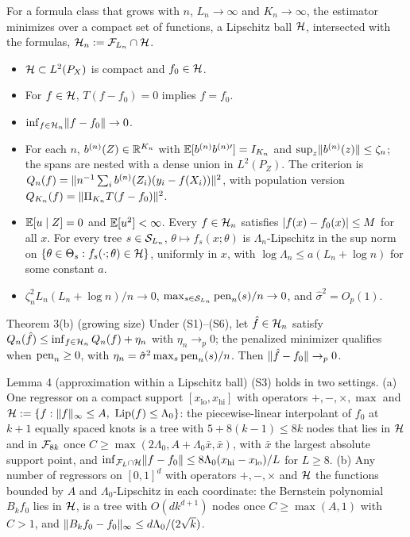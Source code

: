 For a formula class that grows with $n$, $L_n \to \infty$ and $K_n \to \infty$, the estimator minimizes over a compact set of functions, a Lipschitz ball $\mathcal{H}$, intersected with the formulas, $\mathcal{H}_n := \mathcal{F}_{L_n} \cap \mathcal{H}$.
\begin{itemize}
\item[(S1)] $\mathcal{H} \subset L^2(P_X)$ is compact and $f_0 \in \mathcal{H}$.
\item[(S2)] For $f \in \mathcal{H}$, $T(f - f_0) = 0$ implies $f = f_0$.
\item[(S3)] $\inf_{f \in \mathcal{H}_n}\lVert f - f_0\rVert \to 0$.
\item[(S4)] For each $n$, $b^{(n)}(Z) \in \mathbb{R}^{K_n}$ with $\mathbb{E}[b^{(n)}b^{(n)\prime}] = I_{K_n}$ and $\sup_z\lVert b^{(n)}(z)\rVert \le \zeta_n$; the spans are nested with a dense union in $L^2(P_Z)$. The criterion is $Q_n(f) = \lVert n^{-1}\sum_ib^{(n)}(Z_i)(y_i - f(X_i))\rVert^2$, with population version $Q_{K_n}(f) = \lVert \Pi_{K_n}T(f - f_0)\rVert^2$.
\item[(S5)] $\mathbb{E}[u \mid Z] = 0$ and $\mathbb{E}[u^2] < \infty$. Every $f \in \mathcal{H}_n$ satisfies $\lvert f(x) - f_0(x)\rvert \le M$ for all $x$. For every tree $s \in \mathcal{S}_{L_n}$, $\theta \mapsto f_s(x;\theta)$ is $\Lambda_n$-Lipschitz in the sup norm on $\{\theta \in \Theta_s : f_s(\cdot;\theta) \in \mathcal{H}\}$, uniformly in $x$, with $\log\Lambda_n \le a(L_n + \log n)$ for some constant $a$.
\item[(S6)] $\zeta_n^2L_n(L_n + \log n)/n \to 0$, $\max_{s \in \mathcal{S}_{L_n}}\mathrm{pen}_n(s)/n \to 0$, and $\hat\sigma^2 = O_p(1)$.
\end{itemize}

\begin{result}[Theorem3(b)]{Theorem 3(b) (growing size)}
Under (S1)--(S6), let $\hat f \in \mathcal{H}_n$ satisfy $Q_n(\hat f) \le \inf_{f \in \mathcal{H}_n}Q_n(f) + \eta_n$ with $\eta_n \to_p 0$; the penalized minimizer qualifies when $\mathrm{pen}_n \ge 0$, with $\eta_n = \hat\sigma^2\max_s\mathrm{pen}_n(s)/n$. Then $\lVert \hat f - f_0\rVert \to_p 0$.
\end{result}

\begin{result}[Lemma4]{Lemma 4 (approximation within a Lipschitz ball)}
(S3) holds in two settings. (a) One regressor on a compact support $[x_{\mathrm{lo}}, x_{\mathrm{hi}}]$ with operators $+, -, \times, \max$ and $\Hc := \{f : \norm{f}_\infty \le A,\ \Lip(f) \le \Lambda_0\}$: the piecewise-linear interpolant of $f_0$ at $k + 1$ equally spaced knots is a tree with $5 + 8(k - 1) \le 8k$ nodes that lies in $\mathcal{H}$ and in $\mathcal{F}_{8k}$ once $C \ge \max(2\Lambda_0, A + \Lambda_0\bar x, \bar x)$, with $\bar x$ the largest absolute support point, and $\inf_{\mathcal{F}_L \cap \mathcal{H}}\lVert f - f_0\rVert \le 8\Lambda_0(x_{\mathrm{hi}} - x_{\mathrm{lo}})/L$ for $L \ge 8$. (b) Any number of regressors on $[0,1]^d$ with operators $+, -, \times$ and $\mathcal{H}$ the functions bounded by $A$ and $\Lambda_0$-Lipschitz in each coordinate: the Bernstein polynomial $B_kf_0$ lies in $\mathcal{H}$, is a tree with $O(dk^{d+1})$ nodes once $C \ge \max(A, 1)$ with $C > 1$, and $\lVert B_kf_0 - f_0\rVert_\infty \le d\Lambda_0/(2\sqrt k)$.
\end{result}

